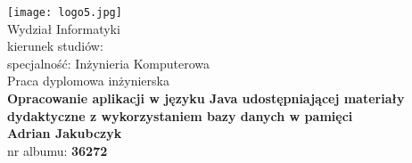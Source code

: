 %

\begingroup
\firaoldstyle  %
\centering %
\thispagestyle{empty} %

    \texttt{[image: logo5.jpg]}\\[.75cm]

Wydział Informatyki\\[.25cm]
kierunek studiów: \field\\[.25cm]
specjalność: Inżynieria Komputerowa\\[1.75cm]
{\Large Praca dyplomowa inżynierska}\\[1cm]

\Large {\bfseries \MakeUppercase  Opracowanie aplikacji w języku Java udostępniającej materiały dydaktyczne z wykorzystaniem bazy danych w
pamięci
 }\\[.5cm]

{\large \bfseries Adrian Jakubczyk}\\[.5cm]
{nr albumu: \bfseries {36272}}\\[1cm]


